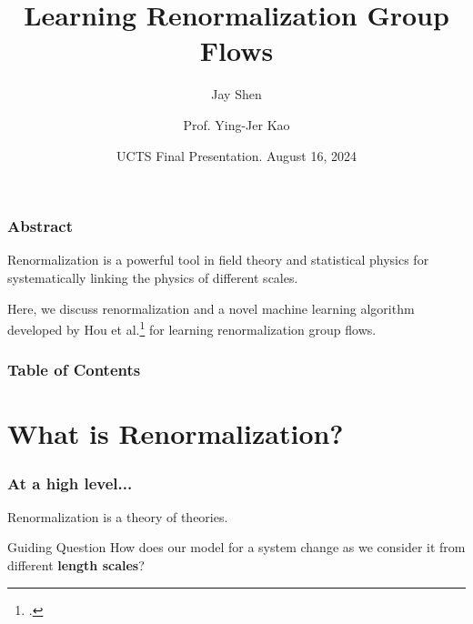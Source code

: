 \documentclass[aspectratio=169, 12pt]{beamer}
\title{Learning Renormalization Group Flows}
\author[Jay Shen]{ 
    Jay Shen
    \and
    Prof. Ying-Jer Kao
}
\date[August 16, 2024] {
    UCTS Final Presentation. August 16, 2024
}
\begin{document}
\frame{\titlepage}

\begin{frame}

    \frametitle{Abstract}

    Renormalization is a powerful tool in field theory and statistical physics for systematically linking the physics of different scales. 

    \vspace{1em}

    Here, we discuss renormalization and a novel machine learning algorithm developed by Hou et al.\footcite{mlrg} for learning renormalization group flows. 
    
\end{frame}

\begin{frame}
    \frametitle{Table of Contents}
    \tableofcontents
\end{frame}

\section{What is Renormalization?}

\begin{frame}
    \frametitle{At a high level...}

    Renormalization is a theory of theories. 

    \begin{alertblock}{Guiding Question}
        How does our model for a system change as we consider it from different \textbf{length scales}?
    \end{alertblock}

\end{frame}
\end{document}
